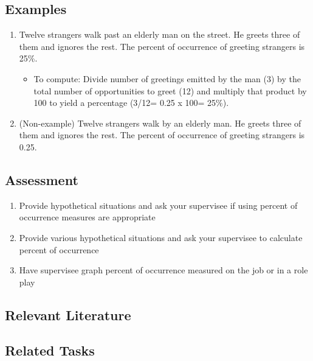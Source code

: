 \subsection{Examples}
\begin{enumerate}
\item  Twelve strangers walk past an elderly man on the street. He greets three of them and ignores the rest. The percent of occurrence of greeting strangers is 25\%.
\begin{itemize}
\item To compute: Divide number of greetings emitted by the man (3) by the total number of opportunities to greet (12) and multiply that product by 100 to yield a percentage (3/12= 0.25 x 100= 25\%).
\end{itemize}
\item (Non-example) Twelve strangers walk by an elderly man. He greets three of them and ignores the rest. The percent of occurrence of greeting strangers is 0.25. 
\end{enumerate}
%
\subsection{Assessment}
\begin{enumerate}
\item Provide hypothetical situations and ask your supervisee if using percent of occurrence measures are appropriate
\item Provide various hypothetical situations and ask your supervisee to calculate percent of occurrence
\item Have supervisee graph percent of occurrence measured on the job or in a role play
\end{enumerate}
%
\subsection{Relevant Literature}
\begin{refsection}
\nocite{cooper2007applied}
\printbibliography[heading=none]
\end{refsection}
%
\subsection{Related Tasks}
\fouriOne{}\\
\fourhOne{}\\
\fourFKFourtySeven\\
%
\clearpage \section[\fourFKFourtySeven{}]{\fourFKFourtySeven{}%
              }
